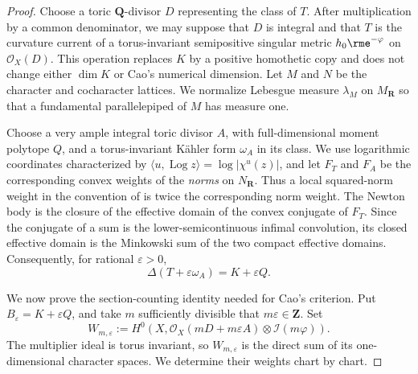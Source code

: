 \begin{proof}
Choose a toric \(\mathbf Q\)-divisor \(D\) representing the class of \(T\).
After multiplication by a common denominator, we may suppose that \(D\) is
integral and that \(T\) is the curvature current of a torus-invariant
semipositive singular metric \(h_0\rme^{-\varphi}\) on
\(\mathcal O_X(D)\).  This operation replaces \(K\) by a positive homothetic
copy and does not change either \(\dim K\) or Cao's numerical dimension.  Let
\(M\) and \(N\) be the character and cocharacter lattices.  We normalize
Lebesgue measure \(\lambda_M\) on \(M_{\mathbf R}\) so that a fundamental
parallelepiped of \(M\) has measure one.

Choose a very ample integral toric divisor \(A\), with full-dimensional
moment polytope \(Q\), and a torus-invariant K\"ahler form \(\omega_A\) in
its class.  We use logarithmic coordinates characterized by
\(\langle u,\operatorname{Log}z\rangle=\log|\chi^u(z)|\), and let
\(F_T\) and \(F_A\)
be the corresponding convex weights of the \emph{norms} on
\(N_{\mathbf R}\).  Thus a local squared-norm weight in the convention of
 is twice the corresponding norm weight.  The
Newton body is the closure of the effective domain of the convex conjugate
of \(F_T\).  Since the conjugate of a sum is the
lower-semicontinuous infimal convolution, its closed effective domain is the
Minkowski sum of the two compact effective domains.  Consequently, for
rational \(\varepsilon>0\),
\[
                  \Delta(T+\varepsilon\omega_A)=K+\varepsilon Q.
\tag{55.51}\label{eq:ok-toric-minkowski}
\]

We now prove the section-counting identity needed for Cao's criterion.  Put
\(B_\varepsilon=K+\varepsilon Q\), and take \(m\) sufficiently divisible that
\(m\varepsilon\in\mathbf Z\).  Set
\[
 W_{m,\varepsilon}:=
 H^0\!\left(X,\mathcal O_X(mD+m\varepsilon A)
                 \otimes\mathcal I(m\varphi)\right).
\]
The multiplier ideal is torus invariant, so \(W_{m,\varepsilon}\) is the
direct sum of its one-dimensional character spaces.  We determine their
weights chart by chart.


\end{proof}
